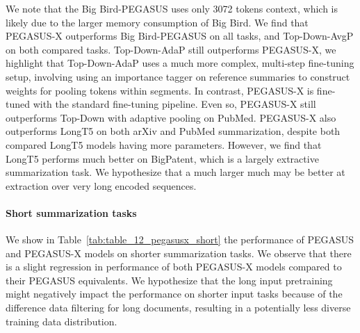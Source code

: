 \documentclass[11pt]{article}
\newcommand{\largemodel}{PEGASUS-X}
\begin{document}
We note that the Big Bird-PEGASUS uses only 3072 tokens context, which is likely due to the larger memory consumption of Big Bird.
We find that \largemodel{} outperforms Big Bird-PEGASUS on all tasks, and Top-Down-AvgP on both compared tasks.
Top-Down-AdaP still outperforms \largemodel{}, we highlight that Top-Down-AdaP uses a much more complex, multi-step fine-tuning setup, involving using an importance tagger on reference summaries to construct weights for pooling tokens within segments.
In contrast, \largemodel{} is fine-tuned with the standard fine-tuning pipeline.
Even so, \largemodel{} still outperforms Top-Down with adaptive pooling on PubMed.
\largemodel{} also outperforms LongT5 on both arXiv and PubMed summarization, despite both compared LongT5 models having more parameters.
However, we find that LongT5 performs much better on BigPatent, which is a largely extractive summarization task. We hypothesize that a much larger much may be better at extraction over very long encoded sequences.

\paragraph{Short summarization tasks}

We show in Table~\ref{tab:table_12_pegasusx_short} the performance of PEGASUS and \largemodel{} models on shorter summarization tasks.
We observe that there is a slight regression in performance of both \largemodel{} models compared to their PEGASUS equivalents. 
We hypothesize that the long input pretraining might negatively impact the performance on shorter input tasks because of the difference data filtering for long documents, resulting in a potentially less diverse training data distribution.
\end{document}
